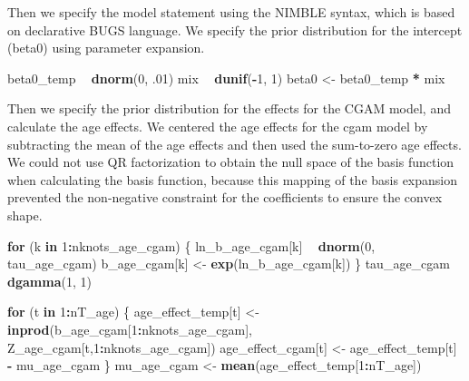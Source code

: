\documentclass[11pt,]{article}
\newenvironment{Shaded}{\begin{snugshade}}{\end{snugshade}}
\newcommand{\KeywordTok}[1]{\textcolor[rgb]{0.13,0.29,0.53}{\textbf{#1}}}
\newcommand{\DecValTok}[1]{\textcolor[rgb]{0.00,0.00,0.81}{#1}}
\newcommand{\StringTok}[1]{\textcolor[rgb]{0.31,0.60,0.02}{#1}}
\newcommand{\ControlFlowTok}[1]{\textcolor[rgb]{0.13,0.29,0.53}{\textbf{#1}}}
\newcommand{\OperatorTok}[1]{\textcolor[rgb]{0.81,0.36,0.00}{\textbf{#1}}}
\newcommand{\NormalTok}[1]{#1}
\begin{document}
Then we specify the model statement using the NIMBLE syntax, which is
based on declarative BUGS language. We specify the prior distribution
for the intercept (beta0) using parameter expansion.

\begin{Shaded}
\begin{Highlighting}[]
\NormalTok{  beta0_temp }\OperatorTok{~}\StringTok{ }\KeywordTok{dnorm}\NormalTok{(}\DecValTok{0}\NormalTok{, .}\DecValTok{01}\NormalTok{)}
\NormalTok{  mix }\OperatorTok{~}\StringTok{ }\KeywordTok{dunif}\NormalTok{(}\OperatorTok{-}\DecValTok{1}\NormalTok{, }\DecValTok{1}\NormalTok{)}
\NormalTok{  beta0 <-}\StringTok{ }\NormalTok{beta0_temp }\OperatorTok{*}\StringTok{ }\NormalTok{mix}
\end{Highlighting}
\end{Shaded}

Then we specify the prior distribution for the effects for the CGAM
model, and calculate the age effects. We centered the age effects for
the cgam model by subtracting the mean of the age effects and then used
the sum-to-zero age effects. We could not use QR factorization to obtain
the null space of the basis function when calculating the basis
function, because this mapping of the basis expansion prevented the
non-negative constraint for the coefficients to ensure the convex shape.

\begin{Shaded}
\begin{Highlighting}[]
  \ControlFlowTok{for}\NormalTok{ (k }\ControlFlowTok{in} \DecValTok{1}\OperatorTok{:}\NormalTok{nknots_age_cgam) \{}
\NormalTok{    ln_b_age_cgam[k] }\OperatorTok{~}\StringTok{ }\KeywordTok{dnorm}\NormalTok{(}\DecValTok{0}\NormalTok{, tau_age_cgam)}
\NormalTok{    b_age_cgam[k] <-}\StringTok{ }\KeywordTok{exp}\NormalTok{(ln_b_age_cgam[k])}
\NormalTok{  \}}
\NormalTok{  tau_age_cgam }\OperatorTok{~}\StringTok{ }\KeywordTok{dgamma}\NormalTok{(}\DecValTok{1}\NormalTok{, }\DecValTok{1}\NormalTok{)}

  \ControlFlowTok{for}\NormalTok{ (t }\ControlFlowTok{in} \DecValTok{1}\OperatorTok{:}\NormalTok{nT_age) \{}
\NormalTok{    age_effect_temp[t] <-}\StringTok{ }\KeywordTok{inprod}\NormalTok{(b_age_cgam[}\DecValTok{1}\OperatorTok{:}\NormalTok{nknots_age_cgam],}
\NormalTok{                                 Z_age_cgam[t,}\DecValTok{1}\OperatorTok{:}\NormalTok{nknots_age_cgam])}
\NormalTok{    age_effect_cgam[t] <-}\StringTok{ }\NormalTok{age_effect_temp[t] }\OperatorTok{-}\StringTok{ }\NormalTok{mu_age_cgam}
\NormalTok{  \}}
\NormalTok{  mu_age_cgam <-}\StringTok{ }\KeywordTok{mean}\NormalTok{(age_effect_temp[}\DecValTok{1}\OperatorTok{:}\NormalTok{nT_age])}
\end{Highlighting}
\end{Shaded}
\end{document}

